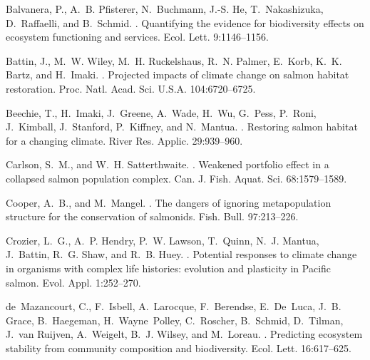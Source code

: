 \documentclass[12pt,english]{article}
\begin{document}
\begin{spacing}{1.3}
\begin{thebibliography}{64}
Balvanera, P., A.~B. Pfisterer, N.~Buchmann, J.-S. He, T.~Nakashizuka,
  D.~Raffaelli, and B.~Schmid.
.
\newblock Quantifying the evidence for biodiversity effects on ecosystem
  functioning and services.
\newblock Ecol. Lett. 9:1146--1156.

Battin, J., M.~W. Wiley, M.~H. Ruckelshaus, R.~N. Palmer, E.~Korb, K.~K. Bartz,
  and H.~Imaki.
.
\newblock Projected impacts of climate change on salmon habitat restoration.
\newblock Proc. Natl. Acad. Sci. U.S.A. 104:6720--6725.

Beechie, T., H.~Imaki, J.~Greene, A.~Wade, H.~Wu, G.~Pess, P.~Roni, J.~Kimball,
  J.~Stanford, P.~Kiffney, and N.~Mantua.
.
\newblock Restoring salmon habitat for a changing climate.
\newblock River Res. Applic. 29:939--960.

Carlson, S.~M., and W.~H. Satterthwaite.
.
\newblock Weakened portfolio effect in a collapsed salmon population complex.
\newblock Can. J. Fish. Aquat. Sci. 68:1579--1589.

Cooper, A.~B., and M.~Mangel.
.
\newblock The dangers of ignoring metapopulation structure for the conservation
  of salmonids.
\newblock Fish. Bull. 97:213--226.

Crozier, L.~G., A.~P. Hendry, P.~W. Lawson, T.~Quinn, N.~J. Mantua, J.~Battin,
  R.~G. Shaw, and R.~B. Huey.
.
\newblock Potential responses to climate change in organisms with complex life
  histories: evolution and plasticity in {Pacific} salmon.
\newblock Evol. Appl. 1:252--270.

de~Mazancourt, C., F.~Isbell, A.~Larocque, F.~Berendse, E.~De~Luca, J.~B.
  Grace, B.~Haegeman, H.~Wayne~Polley, C.~Roscher, B.~Schmid, D.~Tilman, J.~van
  Ruijven, A.~Weigelt, B.~J. Wilsey, and M.~Loreau.
.
\newblock Predicting ecosystem stability from community composition and
  biodiversity.
\newblock Ecol. Lett. 16:617--625.


\end{thebibliography}
\end{spacing}
\end{document}
